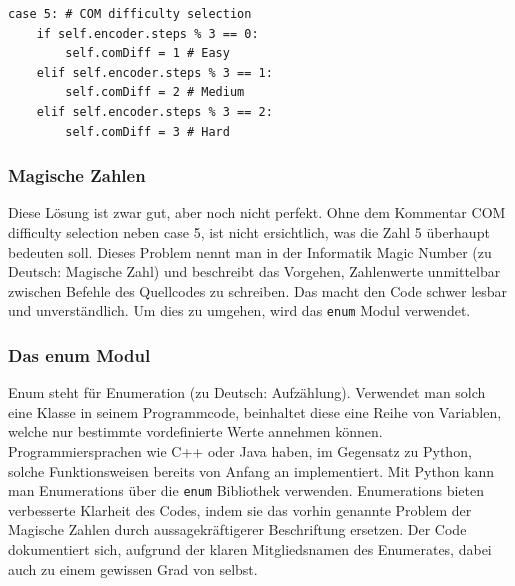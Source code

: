\begin{scriptsize}
\begin{lstlisting}[captionpos=b, caption = {Besserer Code für die Auswahl der Computerschwierigkeitsstufe}]
case 5: # COM difficulty selection
    if self.encoder.steps % 3 == 0:
        self.comDiff = 1 # Easy
    elif self.encoder.steps % 3 == 1:
        self.comDiff = 2 # Medium
    elif self.encoder.steps % 3 == 2:
        self.comDiff = 3 # Hard
\end{lstlisting}
\end{scriptsize}

\subsubsection{Magische Zahlen}
Diese Lösung ist zwar gut, aber noch nicht perfekt. Ohne dem Kommentar \glqq{}COM difficulty selection\grqq{} neben 
case 5, ist nicht ersichtlich, was die Zahl 5 überhaupt bedeuten soll. Dieses Problem nennt man in der Informatik 
\glqq{}Magic Number\grqq{} (zu Deutsch: Magische Zahl) und beschreibt das Vorgehen, Zahlenwerte unmittelbar zwischen 
Befehle des Quellcodes zu schreiben. Das macht den Code schwer lesbar und unverständlich. \cite{magic-numbers} Um dies 
zu umgehen, wird das \verb|enum| Modul verwendet.

\subsubsection{Das enum Modul}
Enum steht für \glqq{}Enumeration\grqq{} (zu Deutsch: Aufzählung). Verwendet man solch eine Klasse in seinem 
Programmcode, beinhaltet diese eine Reihe von Variablen, welche nur bestimmte vordefinierte Werte annehmen können. 
Programmiersprachen wie C++ oder Java haben, im Gegensatz zu Python, solche Funktionsweisen bereits von Anfang an 
implementiert. Mit Python kann man Enumerations über die \verb|enum| Bibliothek verwenden. Enumerations bieten 
verbesserte Klarheit des Codes, indem sie das vorhin genannte Problem der \glqq{}Magische Zahlen\grqq{} durch 
aussagekräftigerer Beschriftung ersetzen. Der Code dokumentiert sich, aufgrund der klaren Mitgliedsnamen des Enumerates, 
dabei auch zu einem gewissen Grad von selbst. \cite{enum-german}\\


